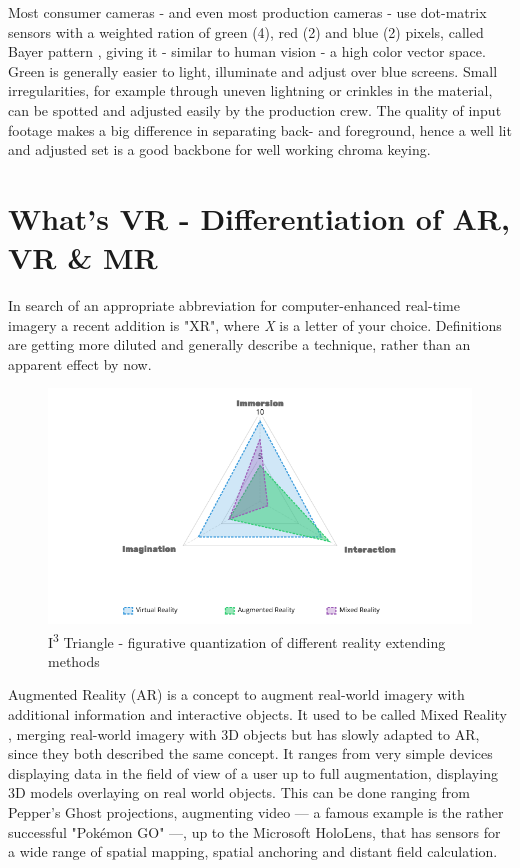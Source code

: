 Most consumer cameras - and even most production cameras - use dot-matrix 
sensors with a weighted ration of green (4), red (2) and blue (2) pixels, 
called Bayer pattern \cite{kodak:bayer:1976}, giving it - similar to human 
vision - a high color vector space. Green is generally easier to light, 
illuminate and adjust over blue screens. Small irregularities, for example 
through uneven lightning or crinkles in the material, can be spotted and 
adjusted easily by the production crew.
\newline
The quality of input footage makes a big difference in separating back- and 
foreground, hence a well lit and adjusted set is a good backbone for well 
working chroma keying.

\section{What's VR - Differentiation of AR, VR \& MR}

In search of an appropriate abbreviation for computer-enhanced real-time 
imagery a recent addition is "XR", where \textit{X} is a letter of your choice. 
Definitions are getting more diluted and generally describe a technique, rather 
than an apparent effect by now.

\begin{figure}[htb]
	\includegraphics[width=\textwidth]{_raw_resources/i3-triangle.png}
	\caption{I\textsuperscript{3} Triangle - figurative quantization of 
		different reality extending methods}
	\label{fig:xr:i3-triangle}
\end{figure}
Augmented Reality (AR) is a concept to augment real-world imagery with 
additional information and interactive objects. It used to be called Mixed 
Reality\cite{satoh:case:1998} \cite{tamura:mixed-reality:2001}, merging 
real-world imagery with 3D objects but has slowly adapted to AR, since they 
both described the same concept. It ranges from very simple devices displaying 
data in the field of view of a user up to full augmentation, displaying 3D 
models overlaying on real world objects. This can be done ranging from Pepper's 
Ghost projections, augmenting video --- a famous example is the rather 
successful "Pokémon GO" ---, up to the Microsoft HoloLens, that has sensors for 
a wide range of spatial mapping, spatial anchoring and distant field 
calculation.

